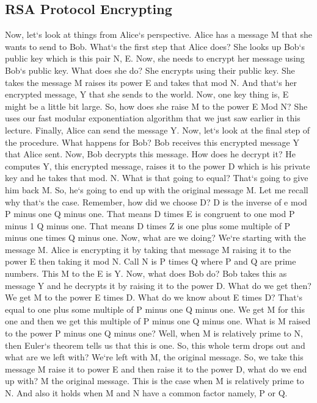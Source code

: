 \subsection{RSA Protocol  Encrypting}
Now, let`s look at things from Alice`s perspective.
Alice has a message M that she wants to send to Bob.
What`s the first step that Alice does? She looks up Bob`s public key which is this pair N, E\@.
Now, she needs to encrypt her message using Bob`s public key.
What does she do? She encrypts using their public key.
She takes the message M raises its power E and takes that mod N\@.
And that`s her encrypted message, Y that she sends to the world.
Now, one key thing is, E might be a little bit large.
So, how does she raise M to the power E Mod N? She uses our fast modular exponentiation algorithm that we just saw earlier in this lecture.
Finally, Alice can send the message Y\@.
Now, let`s look at the final step of the procedure.
What happens for Bob? Bob receives this encrypted message Y that Alice sent.
Now, Bob decrypts this message.
How does he decrypt it? He computes Y, this encrypted message, raises it to the power D which is his private key and he takes that mod.
N\@.
What is that going to equal? That`s going to give him back M\@.
So, he`s going to end up with the original message M\@.
Let me recall why that`s the case.
Remember, how did we choose D? D is the inverse of e mod P minus one Q minus one.
That means D times E is congruent to one mod P minus 1 Q minus one.
That means D times Z is one plus some multiple of P minus one times Q minus one.
Now, what are we doing? We`re starting with the message M\@.
Alice is encrypting it by taking that message M raising it to the power E then taking it mod N\@.
Call N is P times Q where P and Q are prime numbers.
This M to the E is Y\@.
Now, what does Bob do? Bob takes this as message Y and he decrypts it by raising it to the power D\@.
What do we get then? We get M to the power E times D\@.
What do we know about E times D? That`s equal to one plus some multiple of P minus one Q minus one.
We get M for this one and then we get this multiple of P minus one Q minus one.
What is M raised to the power P minus one Q minus one? Well, when M is relatively prime to N, then Euler`s theorem tells us that this is one.
So, this whole term drops out and what are we left with? We`re left with M, the original message.
So, we take this message M raise it to power E and then raise it to the power D, what do we end up with? M the original message.
This is the case when M is relatively prime to N\@.
And also it holds when M and N have a common factor namely, P or Q\@.
